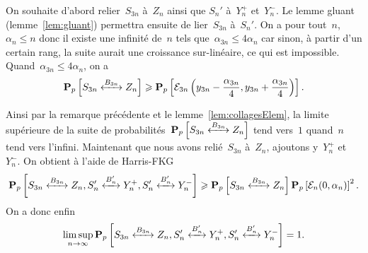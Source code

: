 	On souhaite d'abord relier~$S_{3n}$ à~$Z_n$ ainsi que $S_n'$ à~$Y_n^+$ et~$Y_n^-$. Le lemme gluant (lemme~\ref{lem:gluant}) permettra ensuite de lier~$S_{3n}$ à~$S_n'$. On a pour tout~$n$, $\alpha_n \leq n$ donc il existe une infinité de~$n$ tels que~$\alpha_{3n} \leq 4\alpha_n$ car sinon, à partir d'un certain rang, la suite aurait une croissance sur-linéaire, ce qui est impossible. Quand~$\alpha_{3n} \leq 4\alpha_n$, on a
	\[
		\Pp{\relie[B_{3n}]{S_{3n}}{Z_n}} \geq \Pp{\mathcal{E}_{3n}\left(y_{3n} - \frac{\alpha_{3n}}{4}, y_{3n} + \frac{\alpha_{3n}}{4}\right)}.
	\]

	Ainsi par la remarque précédente et le lemme~\ref{lem:collagesElem}, la limite supérieure de la suite de probabilités~$\Pp{\relie[B_{3n}]{S_{3n}}{Z_n}}$ tend vers~$1$ quand~$n$ tend vers l'infini. Maintenant que nous avons relié~$S_{3n}$ à~$Z_n$, ajoutons y~$Y_n^+$ et~$Y_n^-$. On obtient à l'aide de Harris-FKG
	\[
		\Pp{\relie[B_{3n}]{S_{3n}}{Z_n}, \relie[B_n']{S_n'}{Y_n^+}, \relie[B_n']{S_n'}{Y_n^-}} \geq \Pp{\relie[B_{3n}]{S_{3n}}{Z_n} }\Pp{\mathcal{E}_n(0, \alpha_n)}^2.
	\]
	On a donc enfin
	\[ 
		\limsup_{n \to \infty} \Pp{\relie[B_{3n}]{S_{3n}}{Z_n}, \relie[B_n']{S_n'}{Y_n^+}, \relie[B_n']{S_n'}{Y_n^-}} = 1.
	\]



